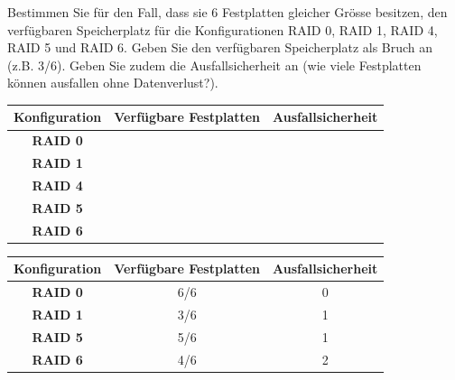 \begin{myexercise}
Bestimmen Sie für den Fall, dass sie 6 Festplatten gleicher Grösse besitzen, den verfügbaren Speicherplatz für die Konfigurationen RAID 0, RAID 1, RAID 4, RAID 5 und RAID 6. Geben Sie den verfügbaren Speicherplatz als Bruch an (z.B. 3/6). Geben Sie zudem die Ausfallsicherheit an (wie viele Festplatten können ausfallen ohne Datenverlust?).

\begin{table}[H]
\centering
\begin{tabular}{c||c|c}
\textbf{Konfiguration} & \textbf{Verfügbare Festplatten} & \textbf{Ausfallsicherheit} \\\midrule\midrule
\textbf{RAID 0} &  &  \\[1cm]\midrule
\textbf{RAID 1} &  &  \\[1cm]\midrule
\textbf{RAID 4} &  &  \\[1cm]\midrule
\textbf{RAID 5} &  &  \\[1cm]\midrule
\textbf{RAID 6} &  &  \\[1cm]
\end{tabular}
\end{table}
\begin{myanswer}
\begin{table}[H]
\centering
\begin{tabular}{c||c|c}
\textbf{Konfiguration} & \textbf{Verfügbare Festplatten} & \textbf{Ausfallsicherheit} \\\midrule\midrule
\textbf{RAID 0} & 6/6 & 0 \\\midrule
\textbf{RAID 1} & 3/6 & 1 \\\midrule
\textbf{RAID 5} & 5/6 & 1 \\\midrule
\textbf{RAID 6} & 4/6 & 2  \\
\end{tabular}
\end{table}
\end{myanswer}
\end{myexercise}


